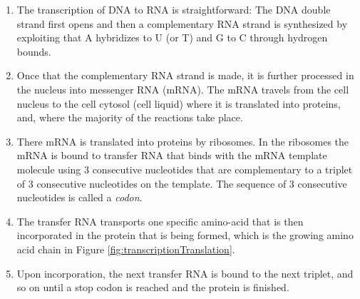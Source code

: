 \documentclass[
  11pt,
]{book}
\begin{document}
\begin{enumerate}
\def\labelenumi{\arabic{enumi}.}
\item
  The transcription of DNA to RNA is straightforward:
  The DNA double strand first opens and then a complementary RNA strand is synthesized by exploiting that A hybridizes to U (or T) and G to C through hydrogen bounds.
\item
  Once that the complementary RNA strand is made, it is further processed in the nucleus into messenger RNA (mRNA). The mRNA travels from the cell nucleus to the cell cytosol (cell liquid) where it is translated into proteins, and, where the majority of the reactions take place.
\item
  There mRNA is translated into proteins by ribosomes.
  In the ribosomes the mRNA is bound to transfer RNA that binds with the mRNA template molecule using 3 consecutive nucleotides that are complementary to a triplet of 3 consecutive nucleotides on the template. The sequence of 3 consecutive nucleotides is called a \emph{codon}.
\item
  The transfer RNA transports one specific amino-acid that is then incorporated in the protein that is being formed, which is the growing amino acid chain in Figure \ref{fig:transcriptionTranslation}.
\item
  Upon incorporation, the next transfer RNA is bound to the next triplet, and so on until a stop codon is reached and the protein is finished.
\end{enumerate}
\end{document}

